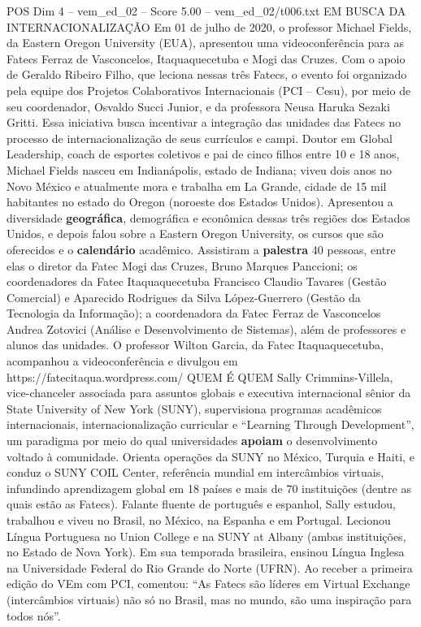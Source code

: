 \begin{textsample}{POS Dim 4 – vem\_ed\_02 – Score 5.00 – vem\_ed\_02/t006.txt}  \label{ex:f4_pos_023}
EM BUSCA DA INTERNACIONALIZAÇÃO Em 01 de julho de 2020, o professor Michael Fields, da Eastern Oregon University (EUA), apresentou uma videoconferência para as Fatecs Ferraz de Vasconcelos, Itaquaquecetuba e Mogi das Cruzes.
Com o apoio de Geraldo Ribeiro Filho, que leciona nessas três Fatecs, o evento foi organizado pela equipe dos Projetos Colaborativos Internacionais (PCI – Cesu), por meio de seu coordenador, Osvaldo Succi Junior, e da professora Neusa Haruka Sezaki Gritti.
Essa iniciativa busca incentivar a integração das unidades das Fatecs no processo de internacionalização de seus currículos e campi.
Doutor em Global Leadership, coach de esportes coletivos e pai de cinco filhos entre 10 e 18 anos, Michael Fields nasceu em Indianápolis, estado de Indiana; viveu dois anos no Novo México e atualmente mora e trabalha em La Grande, cidade de 15 mil habitantes no estado do Oregon (noroeste dos Estados Unidos).
Apresentou a diversidade \textbf{geográfica}, demográfica e econômica dessas três regiões dos Estados Unidos, e depois falou sobre a Eastern Oregon University, os cursos que são oferecidos e o \textbf{calendário} acadêmico.
Assistiram a \textbf{palestra} 40 pessoas, entre elas o diretor da Fatec Mogi das Cruzes, Bruno Marques Panccioni; os coordenadores da Fatec Itaquaquecetuba Francisco Claudio Tavares (Gestão Comercial) e Aparecido Rodrigues da Silva López-Guerrero (Gestão da Tecnologia da Informação); a coordenadora da Fatec Ferraz de Vasconcelos Andrea Zotovici (Análise e Desenvolvimento de Sistemas), além de professores e alunos das unidades.
O professor Wilton Garcia, da Fatec Itaquaquecetuba, acompanhou a videoconferência e divulgou em https://fatecitaqua.wordpress.com/ QUEM É QUEM Sally Crimmins-Villela, vice-chanceler associada para assuntos globais e executiva internacional sênior da State University of New York (SUNY), supervisiona programas acadêmicos internacionais, internacionalização curricular e “Learning Through Development”, um paradigma por meio do qual universidades \textbf{apoiam} o desenvolvimento voltado à comunidade.
Orienta operações da SUNY no México, Turquia e Haiti, e conduz o SUNY COIL Center, referência mundial em intercâmbios virtuais, infundindo aprendizagem global em 18 países e mais de 70 instituições (dentre as quais estão as Fatecs).
Falante fluente de português e espanhol, Sally estudou, trabalhou e viveu no Brasil, no México, na Espanha e em Portugal.
Lecionou Língua Portuguesa no Union College e na SUNY at Albany (ambas instituições, no Estado de Nova York).
Em sua temporada brasileira, ensinou Língua Inglesa na Universidade Federal do Rio Grande do Norte (UFRN).
Ao receber a primeira edição do VEm com PCI, comentou: “As Fatecs são líderes em Virtual Exchange (intercâmbios virtuais) não só no Brasil, mas no mundo, são uma inspiração para todos nós”.

\end{textsample}
